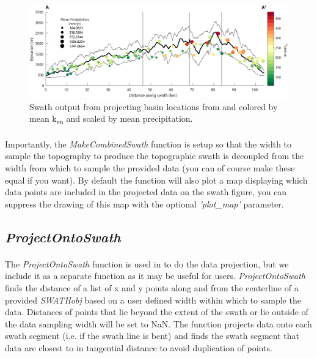 \begin{figure}[H]
	\centering
	\includegraphics[width=16.5cm]{PNGs/SanGabes_KsnSwath.png}
	\caption{Swath output from  projecting basin locations from  and colored by mean k\textsubscript{sn} and scaled by mean precipitation.}
	\label{fig:KsnSwath}
\end{figure}

\paragraph{}Importantly, the \textit{MakeCombinedSwath} function is setup so that the width to sample the topography to produce the topographic swath is decoupled from the width from which to sample the provided data (you can of course make these equal if you want). By default the function will also plot a map displaying which data points are included in the projected data on the swath figure, you can suppress the drawing of this map with the optional \textit{'plot\_map'} parameter.

\subsection{\textit{ProjectOntoSwath}}
\paragraph{}The \textit{ProjectOntoSwath} function is used in  to do the data projection, but we include it as a separate function as it may be useful for users. \textit{ProjectOntoSwath} finds the distance of a list of x and y points along and from the centerline of a provided \textit{SWATHobj} based on a user defined width within which to sample the data. Distances of points that lie beyond the extent of the swath or lie outside of the data sampling width will be set to NaN. The function projects data onto each swath segment (i.e. if the swath line is bent) and finds the swath segment that data are closest to in tangential distance to avoid duplication of  points.

